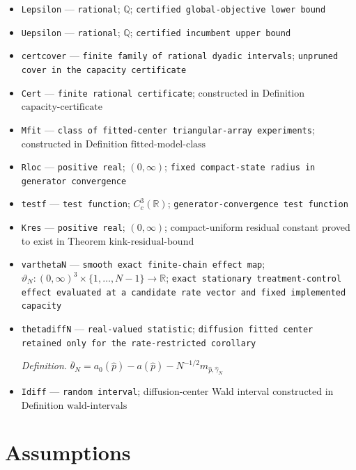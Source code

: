 \documentclass{article}
\begin{document}
\begin{itemize}
  \par\smallskip\noindent\emph{Definition.} \(m_\epsilon=\left\lceil\log_2\max\{1,8/\epsilon\}\right\rceil\)
  \item \texttt{Lepsilon} --- \texttt{rational}; \(\mathbb Q\); \texttt{certified global-\allowbreak{}objective lower bound}
  \item \texttt{Uepsilon} --- \texttt{rational}; \(\mathbb Q\); \texttt{certified incumbent upper bound}
  \item \texttt{certcover} --- \texttt{finite family of rational dyadic intervals}; \texttt{unpruned cover in the capacity certificate}
  \item \texttt{Cert} --- \texttt{finite rational certificate}; constructed in Definition \(\mathrm{capacity\mbox{-}certificate}\)
  \item \texttt{Mfit} --- \texttt{class of fitted-\allowbreak{}center triangular-\allowbreak{}array experiments}; constructed in Definition \(\mathrm{fitted\mbox{-}model\mbox{-}class}\)
  \item \texttt{Rloc} --- \texttt{positive real}; \((0,\infty)\); \texttt{fixed compact-\allowbreak{}state radius in generator convergence}
  \item \texttt{testf} --- \texttt{test function}; \(C_c^3(\mathbb R)\); \texttt{generator-\allowbreak{}convergence test function}
  \item \texttt{Kres} --- \texttt{positive real}; \((0,\infty)\); compact-uniform residual constant proved to exist in Theorem \(\mathrm{kink\mbox{-}residual\mbox{-}bound}\)
  \item \texttt{varthetaN} --- \texttt{smooth exact finite-\allowbreak{}chain effect map}; \(\vartheta_N:(0,\infty)^3\times\{1,\ldots,N-1\}\to\mathbb R\); \texttt{exact stationary treatment-\allowbreak{}control effect evaluated at a candidate rate vector and fixed implemented capacity}
  \item \texttt{thetadiffN} --- \texttt{real-\allowbreak{}valued statistic}; \texttt{diffusion fitted center retained only for the rate-\allowbreak{}restricted corollary}
  \par\smallskip\noindent\emph{Definition.} \(\overline\theta_N=a_0(\widehat p)-a(\widehat p)-N^{-1/2}m_{\widehat p,\widehat\gamma_N}\)
  \item \texttt{Idiff} --- \texttt{random interval}; diffusion-center Wald interval constructed in Definition \(\mathrm{wald\mbox{-}intervals}\)
\end{itemize}

\section{Assumptions}
\end{document}
